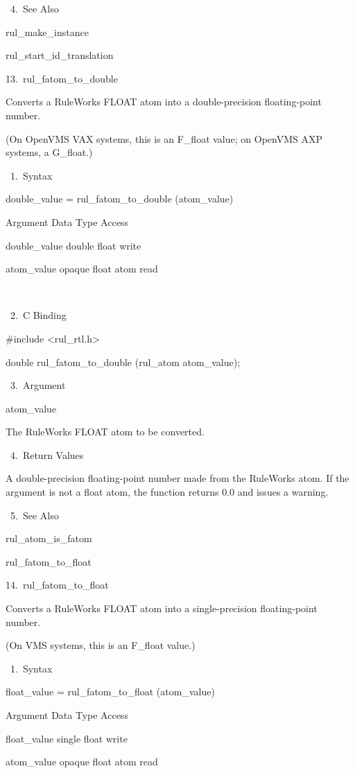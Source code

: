        4. See Also

    rul_make_instance

    rul_start_id_translation

13. rul_fatom_to_double

    Converts a RuleWorks FLOAT atom into a
    double-precision floating-point number.

    (On OpenVMS VAX systems, this is an
    F_float value; on OpenVMS AXP systems, a
    G_float.)

       1. Syntax

          double_value = rul_fatom_to_double
          (atom_value)

          Argument  Data Type     Access

          double_value  double float    write

          atom_value  opaque float atom
             read

           

       2. C Binding

          #include <rul_rtl.h>

          double rul_fatom_to_double (rul_atom
          atom_value);

       3. Argument

          atom_value

          The RuleWorks FLOAT atom to be
          converted.

       4. Return Values

          A double-precision floating-point
          number made from the RuleWorks atom.
          If the argument is not a float atom,
          the function returns 0.0 and issues
          a warning.

       5. See Also

    rul_atom_is_fatom

    rul_fatom_to_float

14. rul_fatom_to_float

    Converts a RuleWorks FLOAT atom into a
    single-precision floating-point number.

    (On VMS systems, this is an F_float
    value.)

       1. Syntax

          float_value = rul_fatom_to_float
          (atom_value)

          Argument  Data Type    Access

          float_value  single float   write

          atom_value  opaque float atom   read

